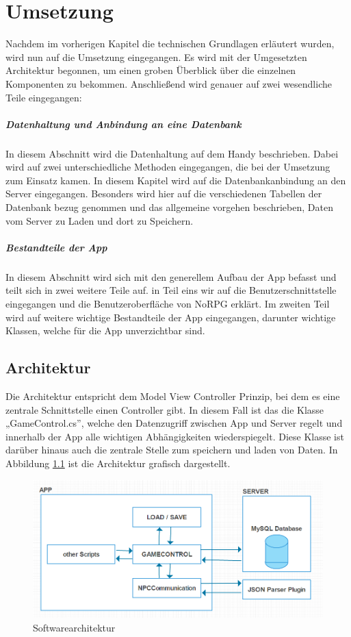 \chapter{Umsetzung}
	Nachdem im vorherigen Kapitel die technischen Grundlagen erläutert wurden, wird nun auf die Umsetzung eingegangen. Es wird mit der Umgesetzten Architektur begonnen, um einen groben Überblick über die einzelnen Komponenten zu bekommen. Anschließend wird genauer auf zwei wesendliche Teile eingegangen:

	\paragraph{Datenhaltung und Anbindung an eine Datenbank}
		In diesem Abschnitt wird die Datenhaltung auf dem Handy beschrieben. Dabei wird auf zwei unterschiedliche Methoden eingegangen, die bei der Umsetzung zum Einsatz kamen. In diesem Kapitel wird auf die Datenbankanbindung an den Server eingegangen. Besonders wird hier auf die verschiedenen Tabellen der Datenbank bezug genommen und das allgemeine vorgehen beschrieben, Daten vom Server zu Laden und dort zu Speichern.

	\paragraph{Bestandteile der App}
		In diesem Abschnitt wird sich mit den generellem Aufbau der App befasst und teilt sich in zwei weitere Teile auf. in Teil eins wir auf die Benutzerschnittstelle eingegangen und die Benutzeroberfläche von NoRPG erklärt. Im zweiten Teil wird auf weitere wichtige Bestandteile der App eingegangen, darunter wichtige Klassen, welche für die App unverzichtbar sind.

	\section{Architektur}
		Die Architektur entspricht dem Model View Controller Prinzip, bei dem es eine zentrale Schnittstelle einen Controller gibt. In diesem Fall ist das die Klasse „GameControl.cs”, welche den Datenzugriff  zwischen App und Server regelt und innerhalb der App alle wichtigen Abhängigkeiten wiederspiegelt. Diese Klasse ist darüber hinaus auch die zentrale Stelle zum speichern und laden von Daten. In Abbildung \ref{architecture} ist die Architektur grafisch dargestellt.

		\begin{figure}[htbp]
			\centering 
			\label{architecture}
			\includegraphics[width=13cm]{pics/archtecture.png}
			\caption{Softwarearchitektur}
		\end{figure}	

